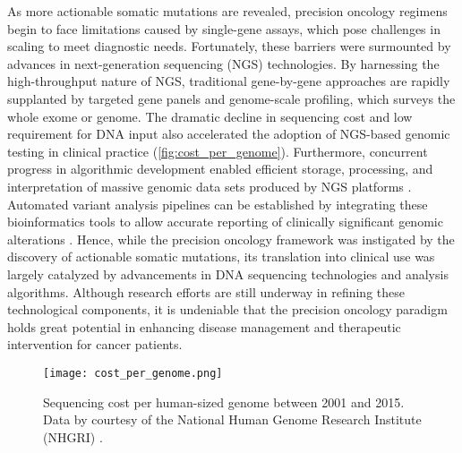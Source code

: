 As more actionable somatic mutations are revealed, precision oncology regimens begin to face limitations caused by single-gene assays, which pose challenges in scaling to meet diagnostic needs. Fortunately, these barriers were surmounted by advances in next-generation sequencing (\acs{NGS}) technologies. By harnessing the high-throughput nature of NGS, traditional gene-by-gene approaches are rapidly supplanted by targeted gene panels and genome-scale profiling, which surveys the whole exome or genome. The dramatic decline in sequencing cost \cite{Wetterstrand2016} and low requirement for DNA input \cite{Rykalina2014, Chung2016, So2017} also accelerated the adoption of NGS-based genomic testing in clinical practice (\autoref{fig:cost_per_genome}). Furthermore, concurrent progress in algorithmic development enabled efficient storage, processing, and interpretation of massive genomic data sets produced by NGS platforms \cite{Torri2012, Pabinger2014}. Automated variant analysis pipelines can be established by integrating these bioinformatics tools to allow accurate reporting of clinically significant genomic alterations \cite{Hyman2015, Laskin2015, Bosdet2013, Sheffield2016}. Hence, while the precision oncology framework was instigated by the discovery of actionable somatic mutations, its translation into clinical use was largely catalyzed by advancements in \acs{DNA} sequencing technologies and analysis algorithms. Although research efforts are still underway in refining these technological components, it is undeniable that the precision oncology paradigm holds great potential in enhancing disease management and therapeutic intervention for cancer patients.


\begin{figure}[H]
	\centering
	\texttt{[image: cost\_per\_genome.png]}
	\caption[Sequencing cost per human-sized genome between 2001 and 2015.]{Sequencing cost per human-sized genome between 2001 and 2015. Data by courtesy of the National Human Genome Research Institute (\acs{NHGRI}) \cite{Wetterstrand2016}.}
	\label{fig:cost_per_genome}
\end{figure}


\newpage
